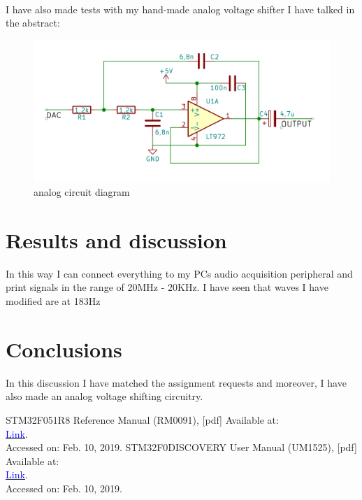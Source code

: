 \documentclass[peerreview]{IEEEtran}
\begin{document}
\\I have also made tests with my hand-made analog voltage shifter I have talked in the abstract:
\begin{figure}[!ht]
\centering
\includegraphics[width=0.8\columnwidth]{diagram} 
\caption{analog circuit diagram}
\label{fig_diagram}
\end{figure}
\section{Results and discussion}
\label{tab:template}
In this way I can connect everything to my PCs audio acquisition peripheral and print signals in the range of 20MHz - 20KHz. I have seen that waves I have modified are at 183Hz
\section{Conclusions}
In this discussion I have matched the assignment requests and moreover, I have also made an analog voltage shifting circuitry.

\begin{thebibliography}{1}
STM32F051R8 Reference Manual (RM0091), [pdf] Available at:\\ \href{https://www.st.com/content/ccc/resource/technical/document/reference_manual/c2/f8/8a/f2/18/e6/43/96/DM00031936.pdf/files/DM00031936.pdf/jcr:content/translations/en.DM00031936.pdf}{\underline{\textcolor{blue}{Link}}}.\\Accessed on: Feb. 10, 2019.
STM32F0DISCOVERY User Manual (UM1525), [pdf] Available at:\\ \href{https://www.st.com/content/ccc/resource/technical/document/user_manual/30/ae/6e/54/d3/b6/46/17/DM00050135.pdf/files/DM00050135.pdf/jcr:content/translations/en.DM00050135.pdf}{\underline{\textcolor{blue}{Link}}}.\\Accessed on: Feb. 10, 2019.
\end{thebibliography}
\end{document}
